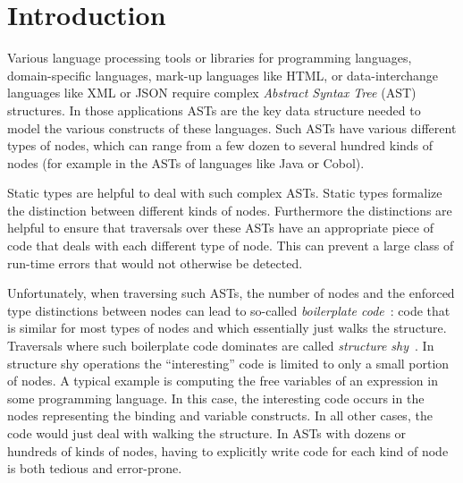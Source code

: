 \section{Introduction}

Various language processing tools or libraries for programming
languages, domain-specific languages, mark-up languages like HTML, or
data-interchange languages like XML or JSON require complex
\emph{Abstract Syntax Tree} (AST) structures. In those applications
ASTs are the key data structure needed to model the various constructs
of these languages. Such ASTs have various different types of nodes,
which can range from a few dozen to several hundred kinds of nodes
(for example in the ASTs of languages like Java or Cobol).

Static types are helpful to deal with such complex ASTs.  Static
types formalize the distinction between different kinds of
nodes. Furthermore the distinctions are helpful to ensure that
traversals over these ASTs have an appropriate piece of code
that deals with each different type of node. This can prevent a large
class of run-time errors that would not otherwise be detected.


Unfortunately, when traversing such ASTs, the number of nodes and the
enforced type distinctions between nodes can lead to so-called
\emph{boilerplate code}~\cite{ralf03syb}: code that is similar for most types of nodes and which
essentially just walks the structure. Traversals where such boilerplate
code dominates are called \emph{structure shy}~\cite{DemeterBook}. In
structure shy operations the ``interesting'' code is limited to only a small portion of nodes.
A typical example is computing the free
variables of an expression in some programming language. In this
case, the interesting code occurs in the nodes representing the
binding and variable constructs. In all other cases, the code would just deal with
walking the structure. In ASTs with dozens or hundreds of
kinds of nodes, having to explicitly write code for each kind of node is both tedious and error-prone.

